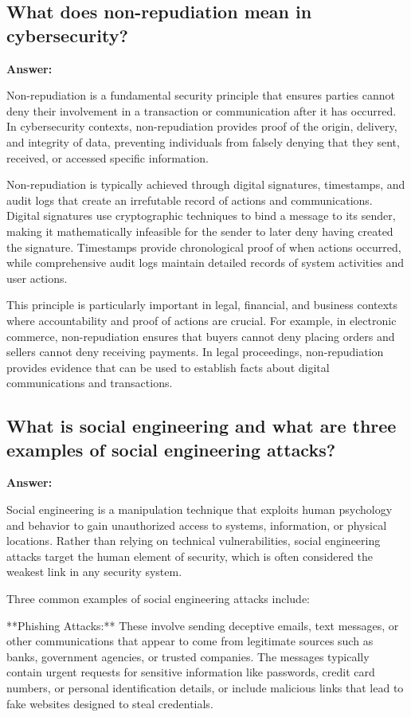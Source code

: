 \documentclass[12pt,a4paper]{article}
\begin{document}
\subsection{What does non-repudiation mean in cybersecurity?}

\textbf{Answer:}

Non-repudiation is a fundamental security principle that ensures parties cannot deny their involvement in a transaction or communication after it has occurred. In cybersecurity contexts, non-repudiation provides proof of the origin, delivery, and integrity of data, preventing individuals from falsely denying that they sent, received, or accessed specific information.

Non-repudiation is typically achieved through digital signatures, timestamps, and audit logs that create an irrefutable record of actions and communications. Digital signatures use cryptographic techniques to bind a message to its sender, making it mathematically infeasible for the sender to later deny having created the signature. Timestamps provide chronological proof of when actions occurred, while comprehensive audit logs maintain detailed records of system activities and user actions.

This principle is particularly important in legal, financial, and business contexts where accountability and proof of actions are crucial. For example, in electronic commerce, non-repudiation ensures that buyers cannot deny placing orders and sellers cannot deny receiving payments. In legal proceedings, non-repudiation provides evidence that can be used to establish facts about digital communications and transactions.

\subsection{What is social engineering and what are three examples of social engineering attacks?}

\textbf{Answer:}

Social engineering is a manipulation technique that exploits human psychology and behavior to gain unauthorized access to systems, information, or physical locations. Rather than relying on technical vulnerabilities, social engineering attacks target the human element of security, which is often considered the weakest link in any security system.

Three common examples of social engineering attacks include:

**Phishing Attacks:** These involve sending deceptive emails, text messages, or other communications that appear to come from legitimate sources such as banks, government agencies, or trusted companies. The messages typically contain urgent requests for sensitive information like passwords, credit card numbers, or personal identification details, or include malicious links that lead to fake websites designed to steal credentials.
\end{document}
